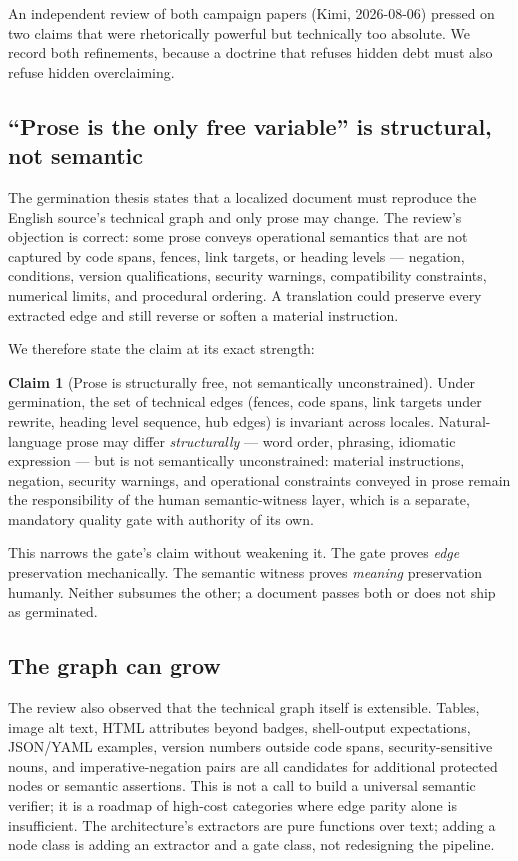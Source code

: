 \documentclass[11pt]{article}
\theoremstyle{definition}
\newtheorem{claim}{Claim}
\theoremstyle{plain}
\theoremstyle{remark}
\begin{document}
An independent review of both campaign papers (Kimi, 2026-08-06) pressed on
two claims that were rhetorically powerful but technically too absolute. We
record both refinements, because a doctrine that refuses hidden debt must
also refuse hidden overclaiming.

\subsection{``Prose is the only free variable'' is structural, not semantic}

The germination thesis states that a localized document must reproduce the
English source's technical graph and only prose may change. The review's
objection is correct: some prose conveys operational semantics that are not
captured by code spans, fences, link targets, or heading levels ---
negation, conditions, version qualifications, security warnings,
compatibility constraints, numerical limits, and procedural ordering. A
translation could preserve every extracted edge and still reverse or soften
a material instruction.

We therefore state the claim at its exact strength:

\begin{claim}[Prose is structurally free, not semantically unconstrained]
\label{cl:prose-structural}
Under germination, the set of technical edges (fences, code spans, link
targets under rewrite, heading level sequence, hub edges) is invariant
across locales. Natural-language prose may differ \emph{structurally} ---
word order, phrasing, idiomatic expression --- but is not semantically
unconstrained: material instructions, negation, security warnings, and
operational constraints conveyed in prose remain the responsibility of the
human semantic-witness layer, which is a separate, mandatory quality gate
with authority of its own.
\end{claim}

This narrows the gate's claim without weakening it. The gate proves
\emph{edge} preservation mechanically. The semantic witness proves
\emph{meaning} preservation humanly. Neither subsumes the other; a document
passes both or does not ship as germinated.

\subsection{The graph can grow}

The review also observed that the technical graph itself is extensible.
Tables, image alt text, HTML attributes beyond badges, shell-output
expectations, JSON/YAML examples, version numbers outside code spans,
security-sensitive nouns, and imperative-negation pairs are all candidates
for additional protected nodes or semantic assertions. This is not a call to
build a universal semantic verifier; it is a roadmap of high-cost categories
where edge parity alone is insufficient. The architecture's extractors are
pure functions over text; adding a node class is adding an extractor and a
gate class, not redesigning the pipeline.
\end{document}
